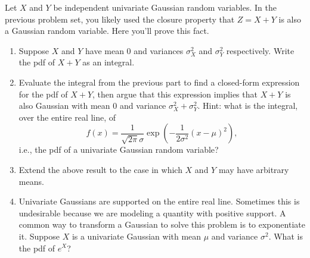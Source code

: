 \documentclass[submit]{harvardml}
\begin{document}
\begin{problem}
  Let $X$ and $Y$ be independent univariate Gaussian random
 variables. In the previous problem set, you likely used the closure property that $Z = X + Y$ is also a Gaussian random variable. Here you'll prove this fact.

\begin{enumerate}[label=(\alph*)]
\item Suppose $X$ and $Y$ have mean 0 and variances $\sigma_X^2$ and $\sigma_Y^2$ respectively. Write the pdf of $X + Y$ as an integral.
\item Evaluate the integral from the previous part to find a closed-form expression for the pdf of $X+Y$, then argue that this expression implies that $X+Y$ is also Gaussian with mean $0$ and variance $\sigma_X^2 + \sigma_Y^2$. Hint: what is the integral, over the entire real line, of
\[
f(x) = \frac{1}{\sqrt{2\pi}\sigma} \exp\left( -\frac{1}{2\sigma^2}(x - \mu)^2 \right) ,
\] i.e., the pdf of a univariate Gaussian random variable?
\item Extend the above result to the case in which $X$ and $Y$ may have arbitrary means.
\item Univariate Gaussians are supported on the entire real line. Sometimes this is undesirable because we are modeling a quantity with positive support. A common way to transform a Gaussian to solve this problem is to exponentiate it. Suppose $X$ is a univariate Gaussian with mean $\mu$ and variance $\sigma^2$. What is the pdf of $e^X$?
\end{enumerate}
\vspace{0.1cm}
\end{problem}
\end{document}
